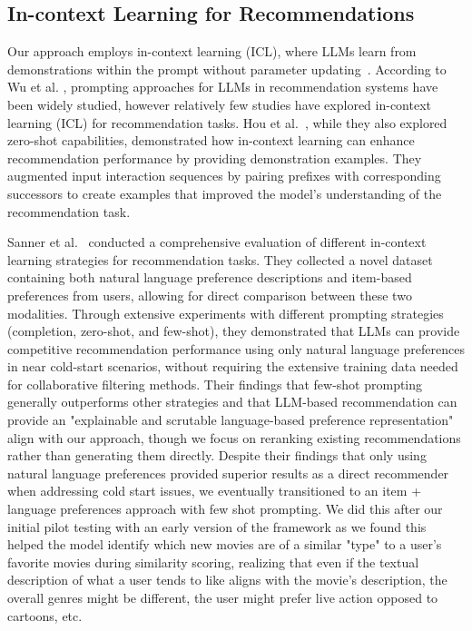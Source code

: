 \documentclass[sigconf]{acmart}
\begin{document}
\subsection{In-context Learning for Recommendations}

Our approach employs in-context learning (ICL), where LLMs learn from demonstrations within the prompt without parameter updating~\cite{brown2020language}. According to Wu et al. \cite{wu2024survey}, prompting approaches for LLMs in recommendation systems have been widely studied, however relatively few studies have explored in-context learning (ICL) for recommendation tasks. Hou et al.~\cite{hou2024large}, while they also explored zero-shot capabilities, demonstrated how in-context learning can enhance recommendation performance by providing demonstration examples. They augmented input interaction sequences by pairing prefixes with corresponding successors to create examples that improved the model's understanding of the recommendation task. 

Sanner et al.~\cite{sanner2023large} conducted a comprehensive evaluation of different in-context learning strategies for recommendation tasks. They collected a novel dataset containing both natural language preference descriptions and item-based preferences from users, allowing for direct comparison between these two modalities. Through extensive experiments with different prompting strategies (completion, zero-shot, and few-shot), they demonstrated that LLMs can provide competitive recommendation performance using only natural language preferences in near cold-start scenarios, without requiring the extensive training data needed for collaborative filtering methods. Their findings that few-shot prompting generally outperforms other strategies and that LLM-based recommendation can provide an "explainable and scrutable language-based preference representation" align with our approach, though we focus on reranking existing recommendations rather than generating them directly. Despite their findings that only using natural language preferences provided superior results as a direct recommender when addressing cold start issues, we eventually transitioned to an item + language preferences approach with few shot prompting. We did this after our initial pilot testing with an early version of the framework as we found this helped the model identify which new movies are of a similar "type" to a user's favorite movies during similarity scoring, realizing that even if the textual description of what a user tends to like aligns with the movie's description, the overall genres might be different, the user might prefer live action opposed to cartoons, etc.
\end{document}
